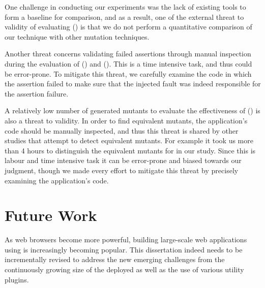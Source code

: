 One challenge in conducting our experiments was the lack of existing \javascript tools to form a baseline for comparison, and as a result, one of the external threat to validity of evaluating \mutandis () is that we do not perform a quantitative comparison 
of our technique with other mutation techniques.

Another threat concerns validating failed assertions through manual inspection during the evaluation of \jseft () and \atrina (). This is a time intensive task, and thus could be error-prone. To mitigate this threat, we carefully examine the code in which the assertion failed to make sure that the injected fault was indeed responsible for the assertion failure.

A relatively low number of generated mutants to evaluate the effectiveness of \mutandis () is also a threat to validity. 
In order to find equivalent mutants, the application's code should be manually inspected, and thus this threat is shared by other studies that attempt to detect equivalent mutants.
For example it took us more than 4 hours to distinguish the equivalent mutants for \jquery in our study. Since this is labour and time intensive task it can be error-prone and biased towards our judgment, though we made every effort to mitigate this threat by precisely examining the application's code. 
\section{Future Work}
As web browsers become more powerful, building large-scale web applications using \javascript is increasingly becoming popular. This dissertation indeed needs to be incrementally revised to address the new emerging challenges from the continuously growing size of the deployed \javascript as well as the use of various \javascript utility plugins. 

